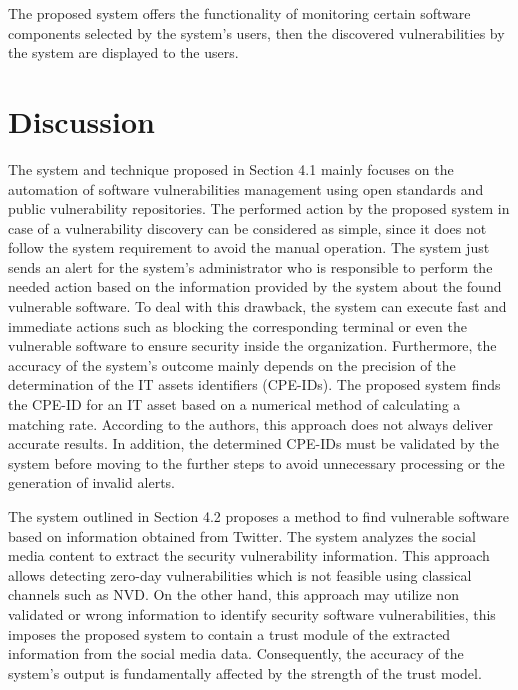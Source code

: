 \documentclass{llncs}
\begin{document}
The proposed system offers the functionality of monitoring certain software components selected by the system's users, then the discovered vulnerabilities by the system are displayed to the users.


  

\section{Discussion}

\par The system and technique proposed in Section 4.1 mainly focuses on the automation of software vulnerabilities management using open standards and public vulnerability repositories. The performed action by the proposed system in case of a vulnerability discovery can be considered as simple, since it does not follow the system requirement to avoid the manual operation. The system just sends an alert for the system's administrator who is responsible to perform the needed action based on the information provided by the system about the found vulnerable software. To deal with this drawback, the system can execute fast and immediate actions such as  blocking the corresponding terminal or even the vulnerable software  to ensure security inside the organization. Furthermore, the accuracy of the system's outcome mainly depends on the precision of the determination of the IT assets identifiers (CPE-IDs). The proposed system finds the CPE-ID for an IT asset based on a numerical method of calculating a matching rate. According to the authors, this approach does not always deliver accurate results. In addition, the determined CPE-IDs must be validated by the system before moving to the further steps to avoid unnecessary processing or the generation of invalid alerts.


\par The system outlined in Section 4.2 proposes a method to find vulnerable software based on information obtained from Twitter. The system analyzes the social media content to extract the security vulnerability information. This approach allows detecting zero-day vulnerabilities which is not feasible using classical channels such as NVD. On the other hand, this approach may utilize non validated or wrong information to  identify security software vulnerabilities, this imposes the proposed system to contain a trust module of the extracted information from the social media data. Consequently, the accuracy of the system's output is  fundamentally affected by the strength of the trust model.
 
\end{document}
